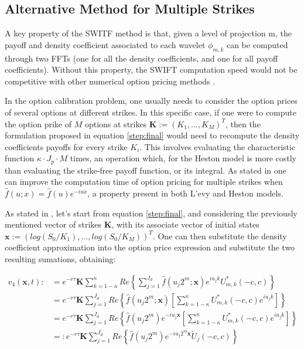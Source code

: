 \documentclass[12,twoside]{mammeTFM}
\theoremstyle{definition}
\theoremstyle{remark}
\begin{document}
\subsection{Alternative Method for Multiple Strikes}\label{subsec:multiple_strikes}
A key property of the SWITF method is that, given a level of projection m, the payoff and density coefficient associated to each wavelet $\phi_{m,k}$ can be computed through two FFTs (one for all the density coefficients, and one for all payoff coefficients). Without this property, the SWIFT computation speed would not be competitive with other numerical option pricing methods \cite{flo20}.

In the option calibration problem, one usually needs to consider the option prices of several options at different strikes. In this specific case, if one were to compute the option prike of $M$ options at strikes $\boldsymbol{K} := (K_1, \ldots, K_M)^{T}$, then the formulation proposed in equation \ref{step:final} would need to recompute the density coefficients payoffs for every strike $K_i$. This involves evaluating the characteristic function $\kappa \cdot J_p \cdot M$ times, an operation which, for the Heston model is more costly than evaluating the strike-free payoff function, or its integral. As stated in \cite{mar17} one can improve the computation time of option pricing for multiple strikes when $\hat{f}(u; x) = \hat{f}(u) e^{-iux}$, a property present in both L'evy and Heston models.

As stated in \cite{mar17}, let's start from equation \ref{step:final}, and considering the previously mentioned vector of strikes $\boldsymbol{K}$, with its associate vector of initial states $\boldsymbol{x} := (log(S_0/K_1), \ldots, log(S_0/K_M))^{T}$. One can then substitute the density coefficient approximation into the option price expression and substitute the two resulting sumations, obtaining:

\begin{align}
v_4(\boldsymbol{x}, t) :&=  e^{-r\tau} \boldsymbol{K} \sum_{k = 1 - \kappa}^{\kappa} Re \left\{ \sum_{j=1}^{J_d} \hat{f}(u_j 2^m; \boldsymbol{x}) e^{i u_j k} U_{m,k}^{*}(-c,c) \right\} \\
& =e^{-r\tau}\boldsymbol{K} \sum_{j=1}^{J_d} Re \left\{ \hat{f}(u_j 2^m;\boldsymbol{x}) \left[ \sum_{k = 1-\kappa}^{\kappa} U_{m,k}^{*}(-c,c) e^{i u_j k} \right] \right\} \\
&= e^{-r\tau}\boldsymbol{K} \sum_{j=1}^{J_d} Re \left\{ \hat{f}(u_j 2^m) e^{-i u_j \boldsymbol{x}} \left[ \sum_{k = 1-\kappa}^{\kappa} U_{m,k}^{*}(-c,c) e^{i u_j k} \right] \right\} \\
\label{step:alternative_final}
&=: e^{-r\tau}\boldsymbol{K} \sum_{j=1}^{J_d} Re \left\{ \hat{f}(u_j 2^m) e^{-i u_j 2^m \boldsymbol{x}} \tilde{U}_j(-c,c) \right\}
\end{align}
\end{document}
